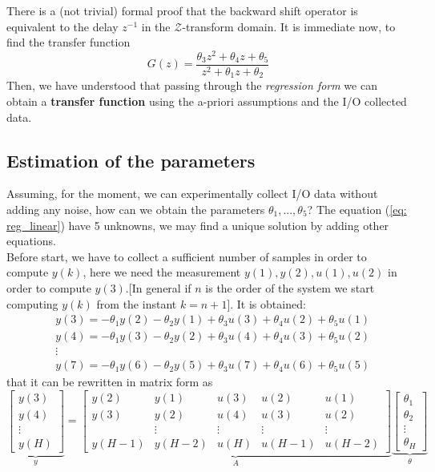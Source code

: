 \noindent
There is a (not trivial) formal proof that the backward shift operator is equivalent to the delay $z^{-1}$ in the $\mathcal{Z}$-transform domain. It is immediate now, to find the transfer function 
\begin{equation}
    G(z) = \frac{
        \theta_3 z^2 + \theta_4z + \theta_5
    }{
        z^{2}+\theta_1z + \theta_2
    }
\end{equation}
Then, we have understood that passing through the \textit{regression form} we can obtain a \textbf{transfer function} using the a-priori assumptions and the I/O collected data.

\subsection{Estimation of the parameters}
Assuming, for the moment, we can experimentally collect I/O data without adding any noise, how can we obtain the parameters $\theta_1, ..., \theta_5$? The equation (\ref{eq: reg_linear}) have 5 unknowns, we may find a unique solution by adding other equations. \\
Before start, we have to collect a sufficient number of samples in order to compute $y(k)$, here we need the measurement $y(1), y(2), u(1), u(2)$ in order to compute $y(3)$.[In general if $n$ is the order of the system we start computing $y(k)$ from the instant $k=n+1$]. It is obtained:
\begin{align*}
    &y(3)=-\theta_1y(2)-\theta_2y(1)+\theta_3u(3)+\theta_4u(2)+\theta_5u(1)\\
    &y(4)=-\theta_1y(3)-\theta_2y(2)+\theta_3u(4)+\theta_4u(3)+\theta_5u(2)\\
    &\vdots\\
    &y(7) = -\theta_1y(6)-\theta_2y(5)+\theta_3u(7)+
    \theta_4u(6)+\theta_5u(5)
\end{align*}
that it can be rewritten in matrix form as
\begin{equation}
    \underbrace{\begin{bmatrix}
        y(3)\\y(4)\\\vdots\\y(H)
    \end{bmatrix}}_{y} 
    =\underbrace{ 
    \begin{bmatrix}
        y(2)&y(1)&u(3)&u(2)&u(1)\\
        y(3)&y(2)&u(4)&u(3)&u(2)\\
        &\vdots&\vdots&\vdots&\vdots\\
        y(H-1)&y(H-2)&u(H)&u(H-1)&u(H-2)
    \end{bmatrix}}_{A} \underbrace{\begin{bmatrix}
        \theta_1\\\theta_2\\\vdots\\\theta_H
    \end{bmatrix}}_{\theta}
\end{equation}
